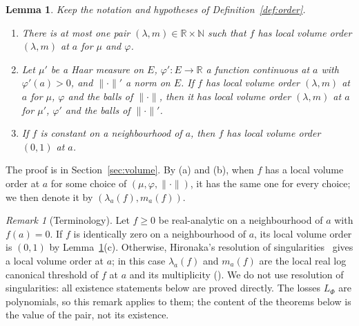 \documentclass[11pt,a4paper]{article}
\newtheorem{lemma}[theorem]{Lemma}
\theoremstyle{definition}
\theoremstyle{remark}
\newtheorem{remark}[theorem]{Remark}
\numberwithin{equation}{section}
\newcommand{\N}{\mathbb{N}}
\newcommand{\R}{\mathbb{R}}
\newcommand{\norm}[1]{\lVert #1\rVert}
\begin{document}
\begin{lemma}\label{lem:order-basic}
Keep the notation and hypotheses of Definition~\ref{def:order}.
\begin{enumerate}[label=\textup{(\alph*)}]
\item There is at most one pair $(\lambda,m)\in\R\times\N$ such that $f$ has local volume order $(\lambda,m)$ at $a$ for $\mu$ and $\varphi$.
\item Let $\mu'$ be a Haar measure on $E$, $\varphi':E\to\R$ a function continuous at $a$ with $\varphi'(a)>0$, and $\norm\cdot'$ a norm on $E$. If $f$ has local volume order $(\lambda,m)$ at $a$ for $\mu$, $\varphi$ and the balls of $\norm\cdot$, then it has local volume order $(\lambda,m)$ at $a$ for $\mu'$, $\varphi'$ and the balls of $\norm\cdot'$.
\item If $f$ is constant on a neighbourhood of $a$, then $f$ has local volume order $(0,1)$ at $a$.
\end{enumerate}
\end{lemma}
The proof is in Section~\ref{sec:volume}. By (a) and (b), when $f$ has a local volume order at $a$ for some choice of $(\mu,\varphi,\norm\cdot)$, it has the same one for every choice; we then denote it by $(\lambda_a(f),m_a(f))$.

\begin{remark}[Terminology]\label{rem:rlct}
Let $f\ge0$ be real-analytic on a neighbourhood of $a$ with $f(a)=0$. If $f$ is identically zero on a neighbourhood of $a$, its local volume order is $(0,1)$ by Lemma~\ref{lem:order-basic}(c). Otherwise, Hironaka's resolution of singularities~\cite{hironaka} gives a local volume order at $a$; in this case $\lambda_a(f)$ and $m_a(f)$ are the local real log canonical threshold of $f$ at $a$ and its multiplicity (\cite[Chapters~2 and~6]{watanabe-book}). We do not use resolution of singularities: all existence statements below are proved directly. The losses $L_\Phi$ are polynomials, so this remark applies to them; the content of the theorems below is the value of the pair, not its existence.
\end{remark}
\end{document}
